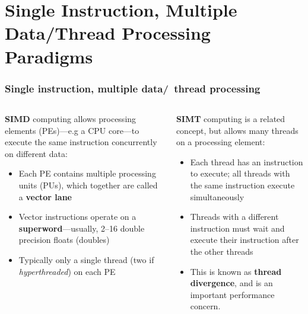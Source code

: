 \documentclass{beamer}
\newcounter{dummynote1}%
\newcounter{dummynote2}%
\begin{document}
\section{Single Instruction, Multiple Data\slash Thread Processing Paradigms}

\begin{frame}
 \frametitle{Single instruction, multiple data\slash~thread processing}
 \setcounter{dummynote1}{\value{footnote}}
 \addtocounter{dummynote1}{1}
 \begin{columns}
 \begin{column}{0.5\textwidth}
  \textbf{SIMD} computing allows processing elements (PEs)---e.g a CPU core---to execute the same instruction concurrently on different data:
  \begin{itemize}
    \item Each PE contains multiple processing units (PUs), which together are called a \textbf{vector lane}
    \item Vector instructions operate on a \textbf{superword}---usually, \numrange{2}{16} double precision floats (doubles)
    \item Typically only a single thread (two if \textit{hyperthreaded}) on each PE
  \end{itemize}
 \end{column}
 \begin{column}{0.5\textwidth}
 \textbf{SIMT} computing is a related concept, but allows many threads on a processing element:
 \begin{itemize}
    \item Each thread has an instruction to execute; all threads with the same instruction execute simultaneously
    \item Threads with a different instruction must wait and execute their instruction after the other threads
    \item This is known as \textbf{thread divergence}, and is an important performance concern.
  \end{itemize}
 \end{column}
 \end{columns}
 \setcounter{footnote}{\value{dummynote1}}
\end{frame}
    
\end{document}
